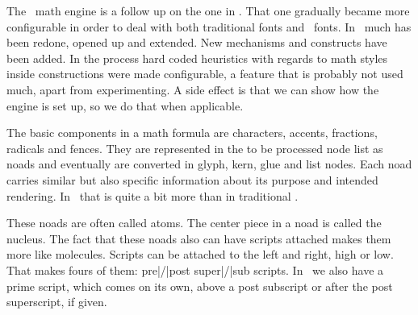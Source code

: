 \stopsection

\startsection[title=Math style variants]

The \LUAMETATEX\ math engine is a follow up on the one in \LUATEX. That one
gradually became more configurable in order to deal with both traditional fonts
and \OPENTYPE\ fonts. In \LUAMETATEX\ much has been redone, opened up and
extended. New mechanisms and constructs have been added. In the process hard
coded heuristics with regards to math styles inside constructions were made
configurable, a feature that is probably not used much, apart from experimenting.
A side effect is that we can show how the engine is set up, so we do that when
applicable.



\stopsection

\startsection[title=Math scripts]

The basic components in a math formula are characters, accents, fractions,
radicals and fences. They are represented in the to be processed node list as
noads and eventually are converted in glyph, kern, glue and list nodes. Each noad
carries similar but also specific information about its purpose and intended
rendering. In \LUAMETATEX\ that is quite a bit more than in traditional \TEX.

These noads are often called atoms. The center piece in a noad is called the
nucleus. The fact that these noads also can have scripts attached makes them more
like molecules. Scripts can be attached to the left and right, high or low. That
makes fours of them: pre|/|post super|/|sub scripts. In \LUAMETATEX\ we also have
a prime script, which comes on its own, above a post subscript or after the post
superscript, if given.

